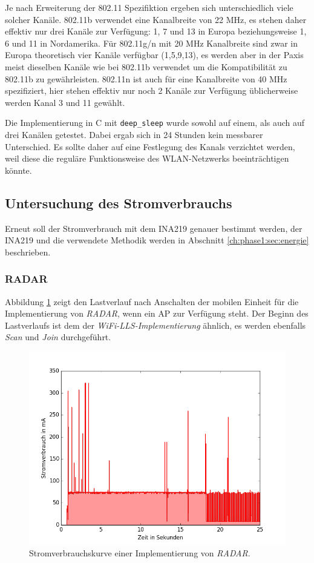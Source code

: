 Je nach Erweiterung der 802.11 Spezifiktion ergeben sich unterschiedlich viele solcher Kanäle.
802.11b verwendet eine Kanalbreite von 22 MHz, es stehen daher effektiv nur drei Kanäle zur Verfügung: 1, 7 und 13 in Europa beziehungsweise 1, 6 und 11 in Nordamerika.
Für 802.11g/n mit 20 MHz Kanalbreite sind zwar in Europa theoretisch vier Kanäle verfügbar (1,5,9,13), es werden aber in der Paxis meist dieselben Kanäle wie bei 802.11b verwendet um die Kompatibilität zu 802.11b zu gewährleisten.
802.11n ist auch für eine Kanalbreite von 40 MHz spezifiziert, hier stehen effektiv nur noch 2 Kanäle zur Verfügung üblicherweise werden Kanal 3 und 11 gewählt.

Die Implementierung in C mit \texttt{deep\_sleep} wurde sowohl auf einem, als auch auf drei Kanälen getestet.
Dabei ergab sich in 24 Stunden kein messbarer Unterschied.
Es sollte daher auf eine Festlegung des Kanals verzichtet werden, weil diese die reguläre Funktionsweise des WLAN-Netzwerks beeinträchtigen könnte.


\subsection{Untersuchung des Stromverbrauchs}
Erneut soll der Stromverbrauch mit dem INA219 genauer bestimmt werden, der INA219 und die verwendete Methodik werden in Abschnitt \ref{ch:phase1:sec:energie} beschrieben.


\subsubsection{RADAR}
\label{ch:phase2:sec:powerradar}
Abbildung \ref{fig:radar5s} zeigt den Lastverlauf nach Anschalten der mobilen Einheit für die Implementierung von \emph{RADAR}, wenn ein AP zur Verfügung steht. 
Der Beginn des Lastverlaufs ist dem der \emph{WiFi-LLS-Implementierung} ähnlich, es werden ebenfalls \emph{Scan} und \emph{Join} durchgeführt.

\begin{figure}[h!]
  \centering
	\includegraphics[width=\textwidth]{plots/radar5s.png}
  \caption{Stromverbrauchskurve einer Implementierung von \emph{RADAR}.}
  \label{fig:radar5s}
\end{figure}

